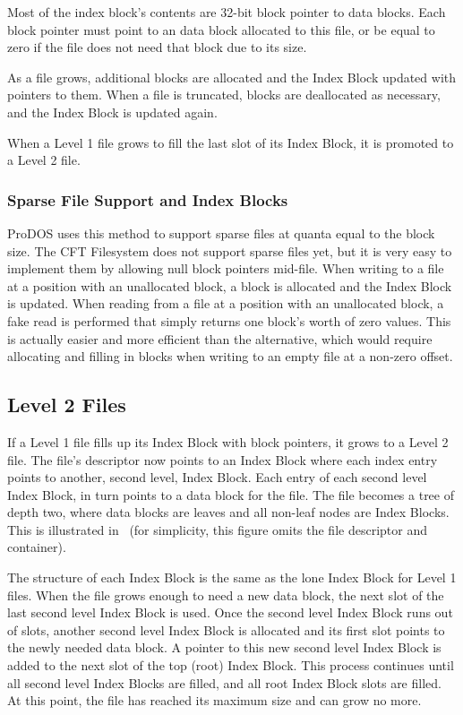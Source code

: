 Most of the index block's contents are 32-bit \gls{block pointer} to
data blocks. Each block pointer must point to an data block allocated
to this file, or be equal to zero if the file does not need that
block due to its size.

As a file grows, additional blocks are allocated and the Index Block
updated with pointers to them. When a file is truncated, blocks are
deallocated as necessary, and the Index Block is updated again.

When a Level 1 file grows to fill the last slot of its Index Block, it
is promoted to a Level 2 file.

\newpage
\subsubsection{Sparse File Support and Index Blocks}

ProDOS uses this method to support sparse files at quanta equal to the
block size. The CFT Filesystem does not support sparse files yet, but
it is very easy to implement them by allowing null block pointers
mid-file. When writing to a file at a position with an unallocated
block, a block is allocated and the Index Block is updated. When
reading from a file at a position with an unallocated block, a fake
read is performed that simply returns one block's worth of zero
values. This is actually easier and more efficient than the
alternative, which would require allocating and filling in blocks when
writing to an empty file at a non-zero offset.

\subsection{Level 2 Files}

If a Level 1 file fills up its Index Block with \glspl{block pointer},
it grows to a Level 2 file. The file's \gls{descriptor} now points to
an Index Block where each index entry points to another, second level,
Index Block. Each entry of each second level Index Block, in turn
points to a data block for the file. The file becomes a tree of depth
two, where data blocks are leaves and all non-leaf nodes are Index
Blocks.  This is illustrated in~ (for simplicity,
this figure omits the file \gls{descriptor} and container).

The structure of each Index Block is the same as the lone Index Block
for Level 1 files. When the file grows enough to need a new data
block, the next slot of the last second level Index Block is
used. Once the second level Index Block runs out of slots, another
second level Index Block is allocated and its first slot points to the
newly needed data block. A pointer to this new second level Index
Block is added to the next slot of the top (root) Index Block. This
process continues until all second level Index Blocks are filled, and
all root Index Block slots are filled. At this point, the file has
reached its maximum size and can grow no more.


